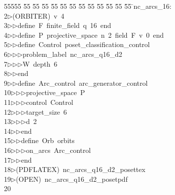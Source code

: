 %
%
\begin{tabbing}
55555 \= 55 \= 55 \= 55 \= 55 \= 55 \= 55 \= 55 \= 55 \= 55 \= 55 \= 55 \= 55 \= \>nc\_arcs\_16:\\[0pt]
2\>$\triangleright$\>(ORBITER)\ v\ 4\ \\[0pt]
3\>$\triangleright$\>$\triangleright$\>define\ F\ finite\_field\ q\ 16\ end\ \\[0pt]
4\>$\triangleright$\>$\triangleright$\>define\ P\ projective\_space\ n\ 2\ field\ F\ v\ 0\ end\ \\[0pt]
5\>$\triangleright$\>$\triangleright$\>define\ Control\ poset\_classification\_control\ \\[0pt]
6\>$\triangleright$\>$\triangleright$\>$\triangleright$\>problem\_label\ nc\_arcs\_q16\_d2\ \\[0pt]
7\>$\triangleright$\>$\triangleright$\>$\triangleright$\>W\ depth\ 6\ \\[0pt]
8\>$\triangleright$\>$\triangleright$\>end\ \\[0pt]
9\>$\triangleright$\>$\triangleright$\>define\ Arc\_control\ arc\_generator\_control\ \\[0pt]
10\>$\triangleright$\>$\triangleright$\>$\triangleright$\>projective\_space\ P\ \\[0pt]
11\>$\triangleright$\>$\triangleright$\>$\triangleright$\>control\ Control\ \\[0pt]
12\>$\triangleright$\>$\triangleright$\>$\triangleright$\>target\_size\ 6\ \\[0pt]
13\>$\triangleright$\>$\triangleright$\>$\triangleright$\>d\ 2\ \\[0pt]
14\>$\triangleright$\>$\triangleright$\>end\ \\[0pt]
15\>$\triangleright$\>$\triangleright$\>define\ Orb\ orbits\ \\[0pt]
16\>$\triangleright$\>$\triangleright$\>$\triangleright$\>on\_arcs\ Arc\_control\ \\[0pt]
17\>$\triangleright$\>$\triangleright$\>end\\[0pt]
18\>$\triangleright$\>(PDFLATEX)\ nc\_arcs\_q16\_d2\_posettex\\[0pt]
19\>$\triangleright$\>(OPEN)\ nc\_arcs\_q16\_d2\_posetpdf\\[0pt]
20\>\end{tabbing}
